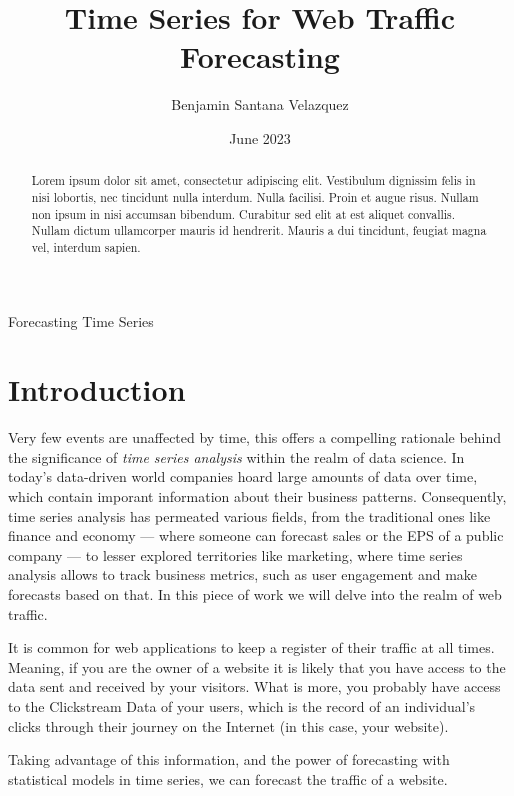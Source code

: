 \documentclass[journal]{IEEEtran}
\title{Time Series for Web Traffic Forecasting}
\author{Benjamin Santana Velazquez}
\date{June 2023}
\begin{document}
\maketitle

\begin{abstract}
    Lorem ipsum dolor sit amet, consectetur adipiscing elit. Vestibulum
    dignissim felis in nisi lobortis, nec tincidunt nulla interdum. Nulla
    facilisi. Proin et augue risus. Nullam non ipsum in nisi accumsan bibendum.
    Curabitur sed elit at est aliquet convallis. Nullam dictum ullamcorper
    mauris id hendrerit. Mauris a dui tincidunt, feugiat magna vel, interdum
    sapien.
\end{abstract}

\begin{IEEEkeywords}
    Forecasting
    Time Series
\end{IEEEkeywords}

\section{Introduction}\label{sec:intro}
Very few events are unaffected by time, this offers a compelling rationale
behind the significance of \emph{time series analysis} within the
realm of data science. In today's data-driven world companies hoard large
amounts of data over time, which contain imporant information about their
business patterns. Consequently, time series analysis has permeated various
fields, from the traditional ones like finance and economy --- where someone
can forecast sales or the EPS of a public company --- to lesser explored
territories like marketing, where time series analysis allows to track business
metrics, such as user engagement and make forecasts based on that. In this
piece of work we will delve into the realm of web traffic.

It is common for web applications to keep a register of their traffic at all
times. Meaning, if you are the owner of a website it is likely that you have
access to the data sent and received by your visitors. What is more, you
probably have access to the Clickstream Data of your users, which is the record
of an individual’s clicks through their journey on the Internet (in this case,
your website).

Taking advantage of this information, and the power of forecasting with
statistical models in time series, we can forecast the traffic of a website.
\end{document}
